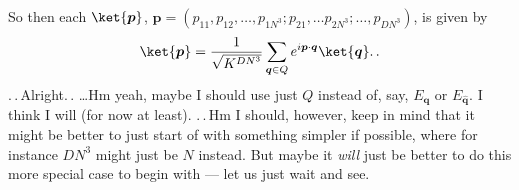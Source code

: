 \documentclass{report}
\begin{document}
So then each $\ket{\boldsymbol{p}}$, $\boldsymbol{p} = (p_{11}, p_{12}, \ldots, p_{1N^3}; p_{21}, \ldots p_{2N^3}; \ldots, p_{D N^3})$, is given by
\begin{align}
\begin{aligned}
	\ket{\boldsymbol{p}} = \frac{1}{\sqrt{K^{D N^3}}} \sum_{\boldsymbol{q}\in Q}
		e^{i \boldsymbol{p} \cdot \boldsymbol{q}} \ket{\boldsymbol{q}}.\,.
\end{aligned}
\end{align} 
.\,.\,Alright.\,. \ldots Hm yeah, maybe I should use just $Q$ instead of, say, $E_{\boldsymbol{q}}$ or $E_{\hat{\boldsymbol{q}}}$. I think I will (for now at least). .\,.\,Hm I should, however, keep in mind that it might be better to just start of with something simpler if possible, where for instance $DN^3$ might just be $N$ instead. But maybe it \emph{will} just be better to do this more special case to begin with --- let us just wait and see. 
\end{document}
